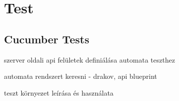 \chapter{Test}
\label{7-test}
\section{Cucumber Tests}
\label{cucumber-test}
szerver oldali api felületek definiálása automata teszthez

automata rendszert keresni - drakov, api blueprint

teszt környezet leírása és használata